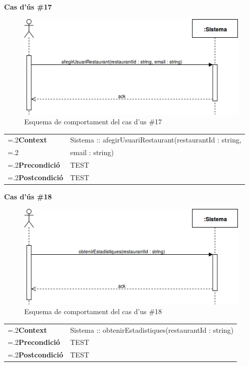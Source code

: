 \clearpage
\noindent\textbf{\large Cas d'ús \#17}\\
\begin{figure}[H]
\centering
\includegraphics[scale=0.6]{Figures/casdus_17.png}
\caption{Esquema de comportament del cas d'us \#17}
\end{figure}
\begin{table}[h]
\noindent
\begin{tabularx}{\linewidth}{
>{\hsize=.2\hsize}X%
>{\hsize=0.8\hsize}X%
}
\textbf{Context} 		& Sistema :: afegirUsuariRestaurant(restaurantId : string,\\
						& email : string) \\
\textbf{Precondició} 	& TEST \\
\textbf{Postcondició}	& TEST \\
\end{tabularx}
\label{}
\end{table}

\noindent\textbf{\large Cas d'ús \#18}\\
\begin{figure}[H]
\centering
\includegraphics[scale=0.6]{Figures/casdus_18.png}
\caption{Esquema de comportament del cas d'us \#18}
\end{figure}
\begin{table}[h]
\noindent
\begin{tabularx}{\linewidth}{
>{\hsize=.2\hsize}X%
>{\hsize=0.8\hsize}X%
}
\textbf{Context} 		& Sistema :: obtenirEstadistiques(restaurantId : string) \\
\textbf{Precondició} 	& TEST \\
\textbf{Postcondició}	& TEST \\
\end{tabularx}
\label{}
\end{table}

